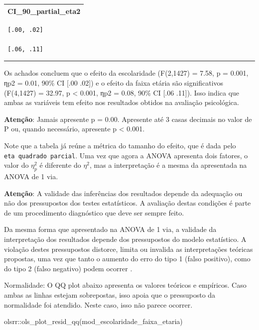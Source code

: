 \documentclass[
]{book}
\newenvironment{Shaded}{\begin{snugshade}}{\end{snugshade}}
\newcommand{\FunctionTok}[1]{\textcolor[rgb]{0.00,0.00,0.00}{#1}}
\newcommand{\NormalTok}[1]{#1}
\newcommand{\SpecialCharTok}[1]{\textcolor[rgb]{0.00,0.00,0.00}{#1}}
\begin{document}
\begin{longtable}[]{@{}c@{}}
\toprule
\endhead
CI\_90\_partial\_eta2 \\
\bottomrule
\end{longtable}

\begin{verbatim}
 [.00, .02]     

 [.06, .11]     
\end{verbatim}

\begin{center}\rule{0.5\linewidth}{0.5pt}\end{center}

Os achados concluem que o efeito da escolaridade (F(2,1427) = 7.58, p = 0.001, ηp2 = 0.01, 90\% CI {[}.00 .02{]}) e o efeito da faixa etária são significativos (F(4,1427) = 32.97, p \textless{} 0.001, ηp2 = 0.08, 90\% CI {[}.06 .11{]}). Isso indica que ambas as variáveis tem efeito nos resultados obtidos na avaliação psicológica.

\textbf{Atenção}: Jamais apresente p = 0.00. Apresente até 3 casas decimais no valor de P ou, quando necessário, apresente p \textless{} 0.001.

Note que a tabela já reúne a métrica do tamanho do efeito, que é dada pelo \texttt{eta\ quadrado\ parcial}. Uma vez que agora a ANOVA apresenta dois fatores, o valor do \(\eta_p^2\) é diferente do \(\eta^2\), mas a interpretação é a mesma da apresentada na ANOVA de 1 via.

\textbf{Atenção}: A validade das inferências dos resultados depende da adequação ou não dos pressupostos dos testes estatísticos. A avaliação destas condições é parte de um procedimento diagnóstico que deve ser sempre feito.

Da mesma forma que apresentado na ANOVA de 1 via, a validade da interpretação dos resultados depende dos pressupostos do modelo estatístico. A violação destes pressupostos distorce, limita ou invalida as interpretações teóricas propostas, uma vez que tanto o aumento do erro do tipo 1 (falso positivo), como do tipo 2 (falso negativo) podem ocorrer \citep{Lix1996, Barker2015, Ernst2017}.

Normalidade: O QQ plot abaixo apresenta os valores teóricos e empíricos. Caso ambas as linhas estejam sobrepostas, isso apoia que o pressuposto da normalidade foi atendido. Neste caso, isso não parece ocorrer.

\begin{Shaded}
\begin{Highlighting}[]
\NormalTok{olsrr}\SpecialCharTok{::}\FunctionTok{ols\_plot\_resid\_qq}\NormalTok{(mod\_escolaridade\_faixa\_etaria)}
\end{Highlighting}
\end{Shaded}
\end{document}
